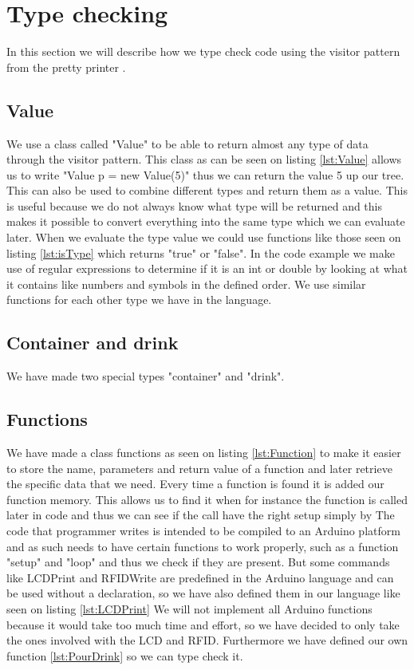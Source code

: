 \section{Type checking}
In this section we will describe how we type check code using the visitor pattern from the pretty printer .

\subsection*{Value}
We use a class called "Value" to be able to return almost any type of data through the visitor pattern.
This class as can be seen on listing \ref{lst:Value} allows us to write "Value p = new Value(5)" thus we can return the value 5 up our tree. This can also be used to combine different types and return them as a value. This is useful because we do not always know what type will be returned and this makes it possible to convert everything into the same type which we can evaluate later.
When we evaluate the type value we could use functions like those seen on listing \ref{lst:isType} which returns "true" or "false". In the code example we make use of regular expressions to determine if it is an int or double by looking at what it contains like numbers and symbols in the defined order. We use similar functions for each other type we have in the language.

\subsection*{Container and drink}
We have made two special types "container" and "drink".

\subsection*{Functions}
We have made a class functions as seen on listing \ref{lst:Function} to make it easier to store the name, parameters and return value of a function and later retrieve the specific data that we need. Every time a function is found it is added our function memory. This allows us to find it when for instance the function is called later in code and thus we can see if the call have the right setup simply by 
The code that programmer writes is intended to be compiled to an Arduino platform and as such needs to have certain functions to work properly, such as a function "setup" and "loop" and thus we check if they are present. But some commands like LCDPrint and RFIDWrite are predefined in the Arduino language and can be used without a declaration, so we have also defined them in our language like seen on listing \ref{lst:LCDPrint}
We will not implement all Arduino functions because it would take too much time and effort, so we have decided to only take the ones involved with the LCD and RFID. Furthermore we have defined our own function \ref{lst:PourDrink} so we can type check it.

